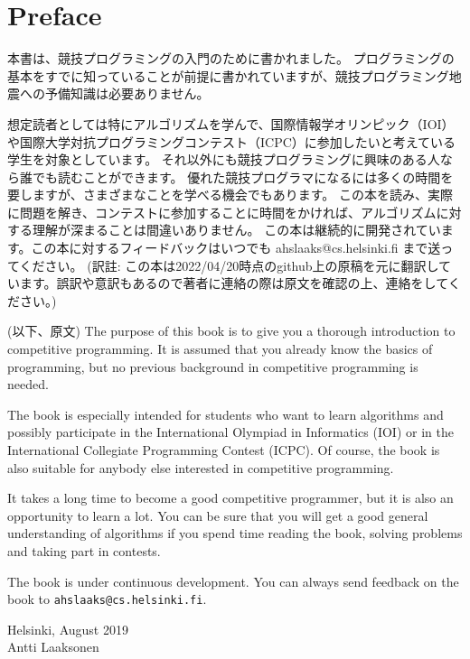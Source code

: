 \chapter*{Preface}

本書は、競技プログラミングの入門のために書かれました。
プログラミングの基本をすでに知っていることが前提に書かれていますが、競技プログラミング地震への予備知識は必要ありません。

想定読者としては特にアルゴリズムを学んで、国際情報学オリンピック（IOI）や国際大学対抗プログラミングコンテスト（ICPC）に参加したいと考えている学生を対象としています。
それ以外にも競技プログラミングに興味のある人なら誰でも読むことができます。
優れた競技プログラマになるには多くの時間を要しますが、さまざまなことを学べる機会でもあります。
この本を読み、実際に問題を解き、コンテストに参加することに時間をかければ、アルゴリズムに対する理解が深まることは間違いありません。
この本は継続的に開発されています。この本に対するフィードバックはいつでも ahslaaks@cs.helsinki.fi まで送ってください。
(訳註: この本は2022/04/20時点のgithub上の原稿を元に翻訳しています。誤訳や意訳もあるので著者に連絡の際は原文を確認の上、連絡をしてください。)

(以下、原文)
The purpose of this book is to give you
a thorough introduction to competitive programming.
It is assumed that you already
know the basics of programming, but no previous
background in competitive programming is needed.

The book is especially intended for
students who want to learn algorithms and
possibly participate in
the International Olympiad in Informatics (IOI) or
in the International Collegiate Programming Contest (ICPC).
Of course, the book is also suitable for
anybody else interested in competitive programming.

It takes a long time to become a good competitive
programmer, but it is also an opportunity to learn a lot.
You can be sure that you will get
a good general understanding of algorithms
if you spend time reading the book,
solving problems and taking part in contests.

The book is under continuous development.
You can always send feedback on the book to
\texttt{ahslaaks@cs.helsinki.fi}.

\begin{flushright}
Helsinki, August 2019 \\
Antti Laaksonen
\end{flushright}
